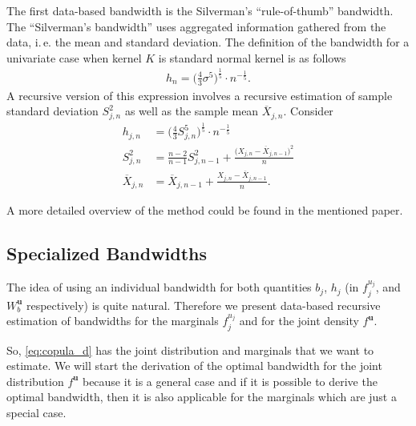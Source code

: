 \documentclass[12pt]{article}
\begin{document}
	The first data-based bandwidth is the Silverman's ``rule-of-thumb'' bandwidth. The ``Silverman's bandwidth'' uses aggregated information gathered from the data, i.\,e. the mean and standard deviation. The definition of the bandwidth for a univariate case when kernel $ K $ is standard normal kernel is as follows \parencite{Silverman1986}
	\begin{align}
		h_n = \bigg(\frac{4}{3}\sigma^5\bigg)^{\frac{1}{5}} \cdot n^{-\frac{1}{5}}.
	\end{align}
	A recursive version of this expression involves a recursive estimation of sample standard deviation $ S^2_{j, n} $ as well as the sample mean $ \overline{X}_{j, n} $. Consider
	\begin{align}
		h_{j, n} &= \bigg(\frac{4}{3}S_{j, n}^5\bigg)^{\frac{1}{5}} \cdot n^{-\frac{1}{5}}\\
		S^2_{j, n} &= \frac{n-2}{n-1}S^2_{j, n-1}+\frac{\big(X_{j, n}-\overline{X}_{j, n-1}\big)^2}{n} \\
		\overline{X}_{j, n} &= \overline{X}_{j, n-1} + \frac{X_{j, n}-\overline{X}_{j, n-1}}{n}.
	\end{align}
	
	A more detailed overview of the method could be found in the mentioned paper.
	
	\subsection{Specialized Bandwidths}\label{sec:spec_bands}
	
	The idea of using an individual bandwidth for both quantities $ b_j $, $ h_j $ (in $ f^{u_j}_j $, and $ W^{\mathbf{u}}_b $ respectively) is quite natural. Therefore we present data-based recursive estimation of bandwidths for the marginals $ f^{u_j}_j $ and for the joint density $ f^{\mathbf{u}} $. 
	
	So, \eqref{eq:copula_d} has the joint distribution and marginals that we want to estimate. We will start the derivation of the optimal bandwidth for the joint distribution $ f^{\mathbf{u}} $ because it is a general case and if it is possible to derive the optimal bandwidth, then it is also applicable for the marginals which are just a special case.
	
\end{document}
